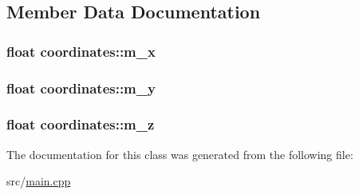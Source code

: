 \subsection{\-Member \-Data \-Documentation}
\hypertarget{classcoordinates_ac82c3ee413f677b1364613568f51e13d}{
\subsubsection[{m\-\_\-x}]{\setlength{\rightskip}{0pt plus 5cm}float {\bf coordinates\-::m\-\_\-x}}}\label{classcoordinates_ac82c3ee413f677b1364613568f51e13d}
\hypertarget{classcoordinates_adc9693154ff491b1b37b52b0fdfcc1fe}{
\subsubsection[{m\-\_\-y}]{\setlength{\rightskip}{0pt plus 5cm}float {\bf coordinates\-::m\-\_\-y}}}\label{classcoordinates_adc9693154ff491b1b37b52b0fdfcc1fe}
\hypertarget{classcoordinates_a4ccdaa5cee635bdc50d85617e1cb65e0}{
\subsubsection[{m\-\_\-z}]{\setlength{\rightskip}{0pt plus 5cm}float {\bf coordinates\-::m\-\_\-z}}}\label{classcoordinates_a4ccdaa5cee635bdc50d85617e1cb65e0}


\-The documentation for this class was generated from the following file\-:\begin{DoxyCompactItemize}
\item 
src/\hyperlink{main_8cpp}{main.\-cpp}\end{DoxyCompactItemize}

